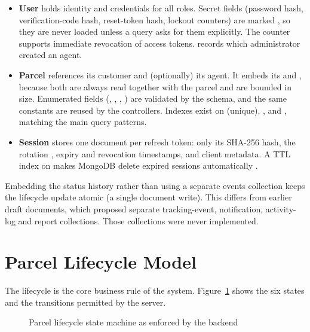 \begin{itemize}
  \item \textbf{User} holds identity and credentials for all roles. Secret fields (password hash, verification-code hash, reset-token hash, lockout counters) are marked , so they are never loaded unless a query asks for them explicitly. The  counter supports immediate revocation of access tokens.  records which administrator created an agent.
  \item \textbf{Parcel} references its customer and (optionally) its agent. It embeds its  and , because both are always read together with the parcel and are bounded in size. Enumerated fields (, , , ) are validated by the schema, and the same constants are reused by the controllers. Indexes exist on  (unique), ,  and , matching the main query patterns.
  \item \textbf{Session} stores one document per refresh token: only its SHA-256 hash, the rotation , expiry and revocation timestamps, and client metadata. A TTL index on  makes MongoDB delete expired sessions automatically \cite{mongodbdocs}.
\end{itemize}

Embedding the status history rather than using a separate events collection keeps the lifecycle update atomic (a single document write). This differs from earlier draft documents, which proposed separate tracking-event, notification, activity-log and report collections. Those collections were never implemented.

\section{Parcel Lifecycle Model}
\label{sec:lifecycle-design}

The lifecycle is the core business rule of the system. Figure~\ref{fig:statemachine} shows the six states and the transitions permitted by the server.

\begin{figure}[htbp]
\centering
\resizebox{\textwidth}{!}{}
\caption{Parcel lifecycle state machine as enforced by the backend}
\label{fig:statemachine}
\end{figure}

